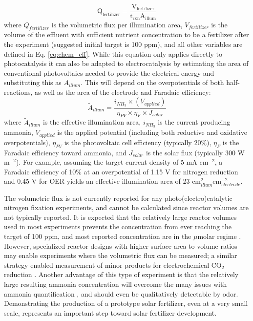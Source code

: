 \begin{equation}
\mathrm{
Q_{fertilizer} = \frac{V_{fertilizer}}{t_{rxn} A_{illum}}
}
\label{eq:flux}
\end{equation}
where $Q_{fertilizer}$ is the volumetric flux per illumination area, $V_{fertilizer}$ is the volume of the effluent with sufficient nutrient concentration to be a fertilizer after the experiment (suggested initial target is 100 ppm), and all other variables are defined in Eq. \ref{eq:chem_eff}. While this equation only applies directly to photocatalysis it can also be adapted to electrocatalysis by estimating the area of conventional photovoltaics needed to provide the electrical energy and substituting this as $A_{illum}$. This will depend on the overpotentials of both half-reactions, as well as the area of the electrode and Faradaic efficiency:
\begin{equation}
    \tilde{A}_{illum} = \frac{i_{NH_3} \times (V_{applied})}{\eta_{PV} \times \eta_F \times J_{solar}}
\end{equation}
where $\tilde{A}_{illum}$ is the effective illumination area, $i_{NH_3}$ is the current producing ammonia, $V_{applied}$ is the applied potential (including both reductive and oxidative overpotentials), $\eta_{PV}$ is the photovoltaic cell efficiency (typically 20\%), $\eta_{F}$ is the Faradaic efficiency toward ammonia, and $J_{solar}$ is the solar flux (typically 300 W m$^{-2}$). For example, assuming the target current density of 5 mA cm$^{-2}$, a Faradaic efficiency of 10\% at an overpotential of 1.15 V for nitrogen reduction \cite{Song_2018} and 0.45 V for OER yields an effective illumination area of 23 cm$^2_{illum}$cm$^{-2}_{electrode}$. 

The volumetric flux is not currently reported for any photo(electro)catalytic nitrogen fixation experiments, and cannot be calculated since reactor volumes are not typically reported. It is expected that the relatively large reactor volumes used in most experiments prevents the concentration from ever reaching the target of 100 ppm, and most reported concentration are in the $\mu$molar regime \cite{Hirakawa_2017,Medford_2017}. However, specialized reactor designs with higher surface area to volume ratios may enable experiments where the volumetric flux can be measured; a similar strategy enabled measurement of minor products for electrochemical CO$_2$ reduction \cite{Kuhl_2012}. Another advantage of this type of experiment is that the relatively large resulting ammonia concentration will overcome the many issues with ammonia quantification \cite{Greenlee_2018,Gao_2018,Zhao_2019,Cui_2018,Suryanto_2019}, and should even be qualitatively detectable by odor. Demonstrating the production of a prototype solar fertilizer, even at a very small scale, represents an important step toward solar fertilizer development.

